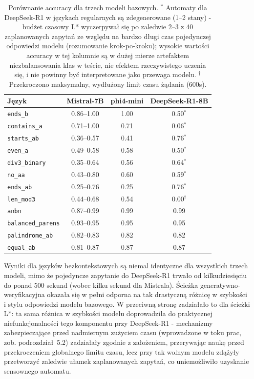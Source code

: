 \documentclass[12pt]{article}
\begin{document}
\begin{table}[h]
\centering
\begin{tabular}{lccc}
\toprule
\textbf{Język} & \textbf{Mistral-7B} & \textbf{phi4-mini} & \textbf{DeepSeek-R1-8B} \\
\midrule
\texttt{ends\_b}          & 0.86--1.00 & 1.00 & 0.50$^{*}$ \\
\texttt{contains\_a}      & 0.71--1.00 & 0.71 & 0.06$^{*}$ \\
\texttt{starts\_ab}       & 0.36--0.57 & 0.41 & 0.76$^{*}$ \\
\texttt{even\_a}          & 0.49--0.58 & 0.58 & 0.50$^{*}$ \\
\texttt{div3\_binary}     & 0.35--0.64 & 0.56 & 0.64$^{*}$ \\
\texttt{no\_aa}           & 0.43--0.80 & 0.60 & 0.59$^{*}$ \\
\texttt{ends\_ab}         & 0.25--0.76 & 0.25 & 0.76$^{*}$ \\
\texttt{len\_mod3}        & 0.44--0.68 & 0.54 & 0.00$^{\dagger}$ \\
\texttt{anbn}             & 0.87--0.99 & 0.99 & 0.99 \\
\texttt{balanced\_parens} & 0.93--0.95 & 0.95 & 0.95 \\
\texttt{palindrome\_ab}   & 0.82--0.83 & 0.82 & 0.82 \\
\texttt{equal\_ab}        & 0.81--0.87 & 0.87 & 0.87 \\
\bottomrule
\end{tabular}
\caption{Porównanie accuracy dla trzech modeli bazowych. $^{*}$ Automaty dla DeepSeek-R1 w językach regularnych są zdegenerowane (1--2 stany) - budżet czasowy L* wyczerpywał się po zaledwie 2--3 z 40 zaplanowanych zapytań ze względu na bardzo długi czas pojedynczej odpowiedzi modelu (rozumowanie krok-po-kroku); wysokie wartości accuracy w tej kolumnie są w dużej mierze artefaktem niezbalansowania klas w teście, nie efektem rzeczywistego uczenia się, i nie powinny być interpretowane jako przewaga modelu. $^{\dagger}$ Przekroczono maksymalny, wydłużony limit czasu żądania (600s).}
\label{tab:model-comparison}
\end{table}

Wyniki dla języków bezkontekstowych są niemal identyczne dla wszystkich trzech modeli, mimo że pojedyncze zapytanie do DeepSeek-R1 trwało od kilkudziesięciu do ponad 500 sekund (wobec kilku sekund dla Mistrala). Ścieżka  generatywno-weryfikacyjna okazała się w pełni odporna na tak drastyczną różnicę w szybkości i stylu odpowiedzi modelu bazowego. W przeciwną stronę zadziałało to dla ścieżki L*: ta sama różnica w szybkości modelu doprowadziła do praktycznej niefunkcjonalności tego komponentu przy DeepSeek-R1 - mechanizmy zabezpieczające przed nadmiernym zużyciem czasu (wprowadzone w toku prac, zob. podrozdział~5.2) zadziałały zgodnie z założeniem, przerywając naukę przed przekroczeniem globalnego limitu czasu, lecz przy tak wolnym modelu zdążyły przetworzyć zaledwie ułamek zaplanowanych zapytań, co uniemożliwiło uzyskanie sensownego automatu.
\end{document}
